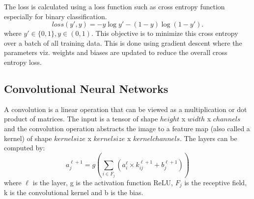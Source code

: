 \documentclass[oneside,a4paper,12pt]{report}
\begin{document}
The loss is calculated using a loss function such as cross entropy function especially for binary classification.
\begin{equation}
    loss(y',y) = -y\log{y'} - (1-y)\log{(1-y')}.
    \label{ANN_loss}
\end{equation}
where $y' \in \{0,1\}, y \in (0,1)$. This objective is to minimize this cross entropy over a batch of all training data. This is done using gradient descent where the parameters viz. weights and biases are updated to reduce the overall cross entropy loss.

\subsection{Convolutional Neural Networks}
\hspace*{0.25 in}A convolution is a linear operation that can be viewed as a multiplication or dot product of matrices. The input is a tensor of shape $height$ x $width$ x $channels$ and the convolution operation abstracts the image to a feature map (also called a kernel) of shape $kernel size$ x $kernel size$ x $kernel channels$. The layers can be computed by:
\begin{equation}
    a^{\ell+1}_j = g(\sum_{i \in F_j}(a_i^\ell \times k_{ij}^{\ell+1} + b_j^{\ell+1}))
    \label{Convolution}
\end{equation}
where $\ell$ is the layer, g is the activation function ReLU, $F_j$ is the receptive field, k is the convolutional kernel and b is the bias.
\end{document}
